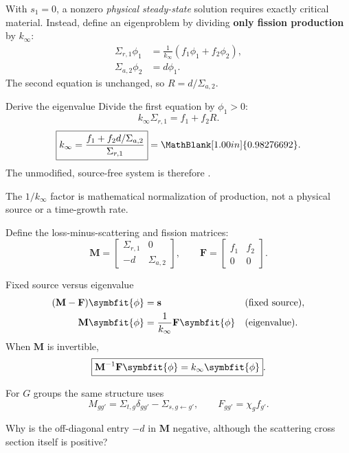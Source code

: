 \newpage
\begin{handoutcolumns}
With $s_1=0$, a nonzero \emph{physical steady-state} solution
requires exactly critical material. Instead, define an eigenproblem
by dividing \textbf{only fission production} by $k_{\infty}$:
\begin{align*}
 \Sigma_{r,1}\phi_1&=
      \frac{1}{k_{\infty}}(f_1\phi_1+f_2\phi_2),\\
 \Sigma_{a,2}\phi_2&=d\phi_1.
\end{align*}
The second equation is unchanged, so $R=d/\Sigma_{a,2}$.
\begin{boardbox}{Derive the eigenvalue}
Divide the first equation by $\phi_1>0$:
\[
 k_{\infty}\Sigma_{r,1}=f_1+f_2R.
\]
\[
 \boxed{k_{\infty}=\frac{f_1+f_2d/\Sigma_{a,2}}{\Sigma_{r,1}}}
 =\MathBlank[1.00in]{0.98276692}.
\]
The unmodified, source-free system is therefore
.
\end{boardbox}
The $1/k_{\infty}$ factor is mathematical normalization of
production, not a physical source or a time-growth rate.

Define the loss-minus-scattering and fission matrices:
\[
 \mathbf M=
 \begin{bmatrix}\Sigma_{r,1}&0\\-d&\Sigma_{a,2}\end{bmatrix},
 \qquad
 \mathbf F=
 \begin{bmatrix}f_1&f_2\\0&0\end{bmatrix}.
\]
\begin{fixedbox}{Fixed source versus eigenvalue}
\begin{align*}
 (\mathbf M-\mathbf F)\symbfit{\phi}&=\mathbf s
           &&\text{(fixed source)},\\
 \mathbf M\symbfit{\phi}&=\frac1{k_{\infty}}
                   \mathbf F\symbfit{\phi}
           &&\text{(eigenvalue)}.
\end{align*}
When $\mathbf M$ is invertible,
\[
 \boxed{\mathbf M^{-1}\mathbf F\symbfit{\phi}
       =k_{\infty}\symbfit{\phi}}.
\]
\end{fixedbox}
For $G$ groups the same structure uses
\[
 M_{gg'}=\Sigma_{t,g}\delta_{gg'}-\Sigma_{s,g\gets g'},
 \qquad F_{gg'}=\chi_g f_{g'}.
\]
\begin{checkpoint}
Why is the off-diagonal entry $-d$ in $\mathbf M$ negative,
although the scattering cross section itself is positive?
\end{checkpoint}


\end{handoutcolumns}
